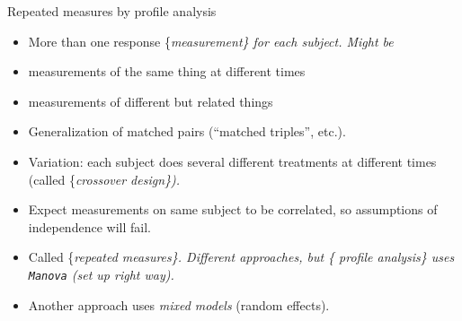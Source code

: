 \documentclass[ignorenonframetext,]{beamer}
\begin{document}
\begin{frame}[fragile]{Repeated measures by profile analysis}
\protect\hypertarget{repeated-measures-by-profile-analysis}{}

\begin{itemize}
\item
  More than one response \{\em measurement\} for each subject. Might be
\item
  measurements of the same thing at different times
\item
  measurements of different but related things
\item
  Generalization of matched pairs (``matched triples'', etc.).
\item
  Variation: each subject does several different treatments at different
  times (called \{\em crossover design\}).
\item
  Expect measurements on same subject to be correlated, so assumptions
  of independence will fail.
\item
  Called \{\em repeated measures\}. Different approaches, but \{\em
  profile analysis\} uses \texttt{Manova} (set up right way).
\item
  Another approach uses \emph{mixed models} (random effects).
\end{itemize}

\end{frame}
\end{document}
